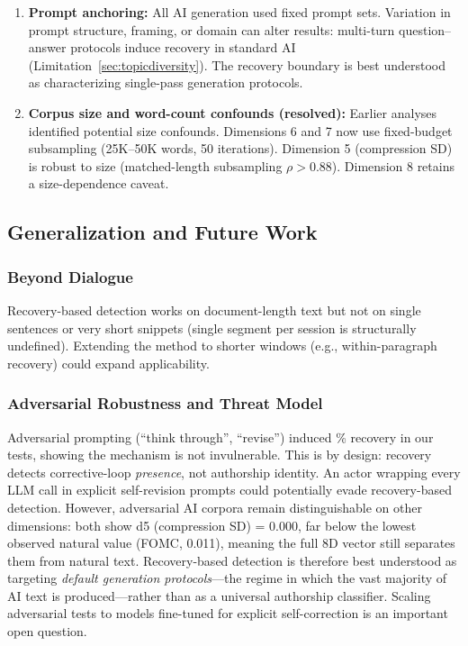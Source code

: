 \documentclass[final]{clv2025}
\begin{document}
\begin{enumerate}
\item \textbf{Prompt anchoring:} All AI generation used fixed prompt sets. Variation in prompt structure, framing, or domain can alter results: multi-turn question--answer protocols induce recovery in standard AI (Limitation~\ref{sec:topicdiversity}). The recovery boundary is best understood as characterizing single-pass generation protocols.

\item \textbf{Corpus size and word-count confounds (resolved):} Earlier analyses identified potential size confounds. Dimensions 6 and 7 now use fixed-budget subsampling (25K--50K words, 50 iterations). Dimension 5 (compression SD) is robust to size (matched-length subsampling $\rho > 0.88$). Dimension 8 retains a size-dependence caveat.

\end{enumerate}

\subsection{Generalization and Future Work}

\subsubsection{Beyond Dialogue}

Recovery-based detection works on document-length text but not on single sentences or very short snippets (single segment per session is structurally undefined). Extending the method to shorter windows (e.g., within-paragraph recovery) could expand applicability.

\subsubsection{Adversarial Robustness and Threat Model}

Adversarial prompting (``think through'', ``revise'') induced \recAdversarial\% recovery in our tests, showing the mechanism is not invulnerable. This is by design: recovery detects corrective-loop \textit{presence}, not authorship identity. An actor wrapping every LLM call in explicit self-revision prompts could potentially evade recovery-based detection. However, adversarial AI corpora remain distinguishable on other dimensions: both show d5 (compression SD) = 0.000, far below the lowest observed natural value (FOMC, 0.011), meaning the full 8D vector still separates them from natural text. Recovery-based detection is therefore best understood as targeting \textit{default generation protocols}---the regime in which the vast majority of AI text is produced---rather than as a universal authorship classifier. Scaling adversarial tests to models fine-tuned for explicit self-correction is an important open question.
\end{document}
